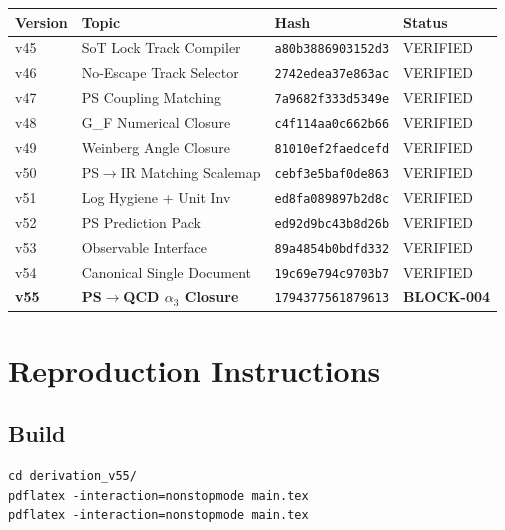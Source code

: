 \documentclass[11pt,a4paper]{article}
\theoremstyle{definition}
\begin{document}
\begin{hashbox}
\begin{center}
\begin{tabular}{llll}
\toprule
\textbf{Version} & \textbf{Topic} & \textbf{Hash} & \textbf{Status} \\
\midrule
v45 & SoT Lock Track Compiler & \texttt{a80b3886903152d3} & VERIFIED \\
v46 & No-Escape Track Selector & \texttt{2742edea37e863ac} & VERIFIED \\
v47 & PS Coupling Matching & \texttt{7a9682f333d5349e} & VERIFIED \\
v48 & G\_F Numerical Closure & \texttt{c4f114aa0c662b66} & VERIFIED \\
v49 & Weinberg Angle Closure & \texttt{81010ef2faedcefd} & VERIFIED \\
v50 & PS$\to$IR Matching Scalemap & \texttt{cebf3e5baf0de863} & VERIFIED \\
v51 & Log Hygiene + Unit Inv & \texttt{ed8fa089897b2d8c} & VERIFIED \\
v52 & PS Prediction Pack & \texttt{ed92d9bc43b8d26b} & VERIFIED \\
v53 & Observable Interface & \texttt{89a4854b0bdfd332} & VERIFIED \\
v54 & Canonical Single Document & \texttt{19c69e794c9703b7} & VERIFIED \\
\midrule
\textbf{v55} & \textbf{PS$\to$QCD $\alpha_3$ Closure} & \texttt{1794377561879613} & \textbf{BLOCK-004} \\
\bottomrule
\end{tabular}
\end{center}
\end{hashbox}

\newpage

\section{Reproduction Instructions}
\label{app:reproduction}

\subsection{Build}
\label{subsec:build}

\begin{verbatim}
cd derivation_v55/
pdflatex -interaction=nonstopmode main.tex
pdflatex -interaction=nonstopmode main.tex
\end{verbatim}
\end{document}
